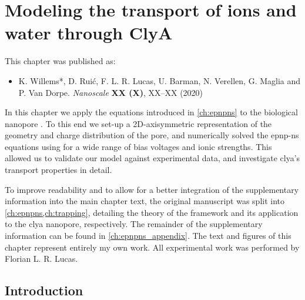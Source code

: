 \chapter{Modeling the transport of ions and water through {ClyA}}
%
\label{ch:transport}
%


%
%
\begin{shaded}
This chapter was published as:
%
\begin{itemize}
  \item K. Willems*, D. Rui\'{c}, F. L. R. Lucas, U. Barman, N. Verellen, G. Maglia and P. Van Dorpe.
        \textit{Nanoscale} \textbf{XX (X)}, XX--XX (2020) %
\end{itemize}
%
\newpage
\end{shaded}
%
%

%

In this chapter we apply the  equations introduced in \cref{ch:epnpns} to the biological
nanopore . To this end we set-up a 2D-axisymmetric representation of the geometry and charge
distribution of the pore, and numerically solved the \gls{epnp-ns} equations using  for a wide
range of bias voltages and ionic strengths. This allowed us to validate our model against experimental data,
and investigate \gls{clya}'s transport properties in detail.
%

%
To improve readability and to allow for a better integration of the supplementary information into the main
chapter text, the original manuscript was split into \cref{ch:epnpns,ch:trapping}, detailing the theory of the
framework and its application to the \gls{clya} nanopore, respectively. The remainder of the supplementary
information can be found in \cref{ch:epnpns_appendix}. The text and figures of this chapter represent entirely
my own work. All experimental work was performed by Florian L. R. Lucas.
%

%
%
%
%


\section{Introduction}
%
\label{sec:transport:intro}
%

